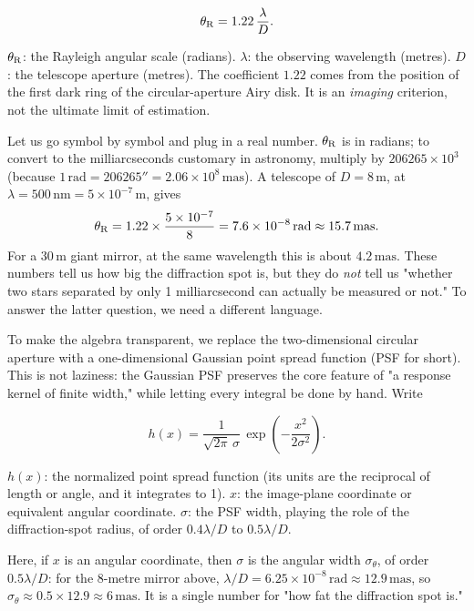 \begin{equation}
  \theta_{\rm R}=1.22\,\frac{\lambda}{D}.
  \label{eq:e12-rayleigh}
\end{equation}
\begin{formulaexplain}
$\theta_{\rm R}$: the Rayleigh angular scale (radians). $\lambda$: the observing wavelength (metres). $D$: the telescope aperture (metres). The coefficient $1.22$ comes from the position of the first dark ring of the circular-aperture Airy disk. It is an \emph{imaging} criterion, not the ultimate limit of estimation.
\end{formulaexplain}

Let us go symbol by symbol and plug in a real number. $\theta_{\rm R}$ is in radians; to convert to the milliarcseconds customary in astronomy, multiply by $206265\times10^3$ (because $1\,\mathrm{rad}=206265''=2.06\times10^{8}\,\mathrm{mas}$). A telescope of $D=8\,\mathrm{m}$, at $\lambda=500\,\mathrm{nm}=5\times10^{-7}\,\mathrm{m}$, gives
\[
  \theta_{\rm R}=1.22\times\frac{5\times10^{-7}}{8}
  =7.6\times10^{-8}\,\mathrm{rad}
  \approx15.7\,\mathrm{mas}.
\]
For a $30\,\mathrm{m}$ giant mirror, at the same wavelength this is about $4.2\,\mathrm{mas}$. These numbers tell us how big the diffraction spot is, but they do \emph{not} tell us "whether two stars separated by only 1 milliarcsecond can actually be measured or not." To answer the latter question, we need a different language.

To make the algebra transparent, we replace the two-dimensional circular aperture with a one-dimensional Gaussian point spread function (PSF for short). This is not laziness: the Gaussian PSF preserves the core feature of "a response kernel of finite width," while letting every integral be done by hand. Write

\begin{equation}
  h(x)=\frac{1}{\sqrt{2\pi}\,\sigma}\,
       \exp\!\left(-\frac{x^{2}}{2\sigma^{2}}\right).
  \label{eq:e12-gaussian-psf}
\end{equation}
\begin{formulaexplain}
$h(x)$: the normalized point spread function (its units are the reciprocal of length or angle, and it integrates to 1). $x$: the image-plane coordinate or equivalent angular coordinate. $\sigma$: the PSF width, playing the role of the diffraction-spot radius, of order $0.4\lambda/D$ to $0.5\lambda/D$.
\end{formulaexplain}

Here, if $x$ is an angular coordinate, then $\sigma$ is the angular width $\sigma_\theta$, of order $0.5\lambda/D$: for the 8-metre mirror above, $\lambda/D=6.25\times10^{-8}\,\mathrm{rad}\approx12.9\,\mathrm{mas}$, so $\sigma_\theta\approx0.5\times12.9\approx6\,\mathrm{mas}$. It is a single number for "how fat the diffraction spot is."

